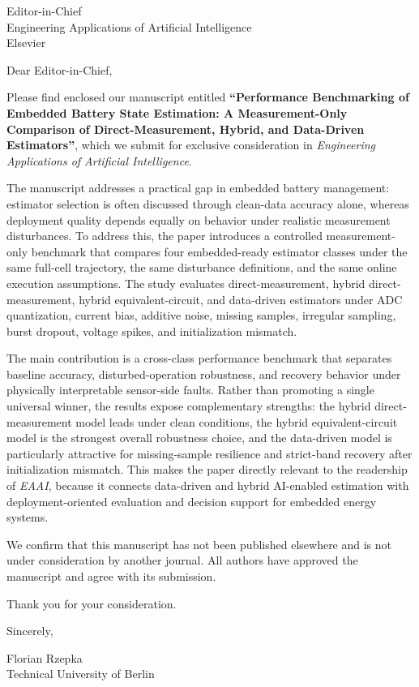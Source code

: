 \documentclass[11pt]{letter}
\date{\today}
\begin{document}
\begin{letter}{Editor-in-Chief\\
Engineering Applications of Artificial Intelligence\\
Elsevier}

\opening{Dear Editor-in-Chief,}

Please find enclosed our manuscript entitled \textbf{``Performance Benchmarking of Embedded Battery State Estimation: A Measurement-Only Comparison of Direct-Measurement, Hybrid, and Data-Driven Estimators''}, which we submit for exclusive consideration in \textit{Engineering Applications of Artificial Intelligence}.

The manuscript addresses a practical gap in embedded battery management: estimator selection is often discussed through clean-data accuracy alone, whereas deployment quality depends equally on behavior under realistic measurement disturbances. To address this, the paper introduces a controlled measurement-only benchmark that compares four embedded-ready estimator classes under the same full-cell trajectory, the same disturbance definitions, and the same online execution assumptions. The study evaluates direct-measurement, hybrid direct-measurement, hybrid equivalent-circuit, and data-driven estimators under ADC quantization, current bias, additive noise, missing samples, irregular sampling, burst dropout, voltage spikes, and initialization mismatch.

The main contribution is a cross-class performance benchmark that separates baseline accuracy, disturbed-operation robustness, and recovery behavior under physically interpretable sensor-side faults. Rather than promoting a single universal winner, the results expose complementary strengths: the hybrid direct-measurement model leads under clean conditions, the hybrid equivalent-circuit model is the strongest overall robustness choice, and the data-driven model is particularly attractive for missing-sample resilience and strict-band recovery after initialization mismatch. This makes the paper directly relevant to the readership of \textit{EAAI}, because it connects data-driven and hybrid AI-enabled estimation with deployment-oriented evaluation and decision support for embedded energy systems.

We confirm that this manuscript has not been published elsewhere and is not under consideration by another journal. All authors have approved the manuscript and agree with its submission.

Thank you for your consideration.

\closing{Sincerely,}

Florian Rzepka\\
Technical University of Berlin
\end{letter}
\end{document}
